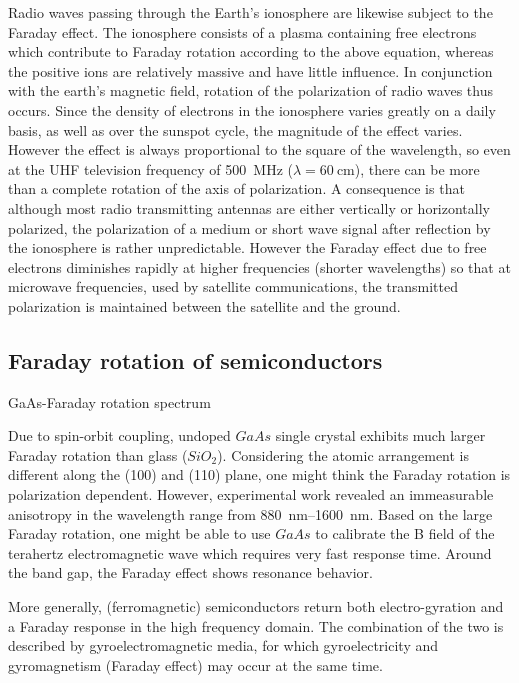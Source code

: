 \documentclass[main.tex]{subfiles}
\begin{document}
Radio waves passing through the Earth's ionosphere are likewise subject to the Faraday effect. The ionosphere consists of a plasma containing free electrons which contribute to Faraday rotation according to the above equation, whereas the positive ions are relatively massive and have little influence. In conjunction with the earth's magnetic field, rotation of the polarization of radio waves thus occurs. Since the density of electrons in the ionosphere varies greatly on a daily basis, as well as over the sunspot cycle, the magnitude of the effect varies. However the effect is always proportional to the square of the wavelength, so even at the UHF television frequency of \SI{500}{\mega\hertz} ($\lambda=\SI{60}{\cm}$), there can be more than a complete rotation of the axis of polarization. A consequence is that although most radio transmitting antennas are either vertically or horizontally polarized, the polarization of a medium or short wave signal after reflection by the ionosphere is rather unpredictable. However the Faraday effect due to free electrons diminishes rapidly at higher frequencies (shorter wavelengths) so that at microwave frequencies, used by satellite communications, the transmitted polarization is maintained between the satellite and the ground.

\subsection{Faraday rotation of semiconductors}

GaAs-Faraday rotation spectrum

Due to spin-orbit coupling, undoped $GaAs$ single crystal exhibits much larger Faraday rotation than glass ($SiO_2$). Considering the atomic arrangement is different along the (100) and (110) plane, one might think the Faraday rotation is polarization dependent. However, experimental work revealed an immeasurable anisotropy in the wavelength range from \SIrange{880}{1600}{\nano\meter}. Based on the large Faraday rotation, one might be able to use $GaAs$ to calibrate the B field of the terahertz electromagnetic wave which requires very fast response time. Around the band gap, the Faraday effect shows resonance behavior.

More generally, (ferromagnetic) semiconductors return both electro-gyration and a Faraday response in the high frequency domain. The combination of the two is described by gyroelectromagnetic media, for which gyroelectricity and gyromagnetism (Faraday effect) may occur at the same time.
\end{document}
